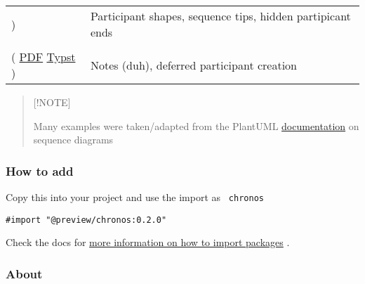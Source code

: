 \begin{longtable}[]{@{}
  >{\raggedright\arraybackslash}p{}
  >{\raggedright\arraybackslash}p{}@{}}
\begin{minipage}[t]{\linewidth}
)\strut
\end{minipage} & Participant shapes, sequence tips, hidden partipicant
ends \\
\begin{minipage}[t]{\linewidth}\raggedright
\texttt{\ notes\ }\strut \\
(
\href{https://github.com/typst/packages/raw/main/packages/preview/chronos/0.2.0/gallery/notes.pdf}{PDF}
\textbar{}
\href{https://github.com/typst/packages/raw/main/packages/preview/chronos/0.2.0/gallery/notes.typ}{Typst}
)\strut
\end{minipage} & Notes (duh), deferred participant creation \\
\end{longtable}

\begin{quote}
{[}!NOTE{]}

Many examples were taken/adapted from the PlantUML
\href{https://plantuml.com/sequence-diagram}{documentation} on sequence
diagrams
\end{quote}

\subsubsection{How to add}\label{how-to-add}

Copy this into your project and use the import as \texttt{\ chronos\ }

\begin{verbatim}
#import "@preview/chronos:0.2.0"
\end{verbatim}



Check the docs for
\href{https://typst.app/docs/reference/scripting/\#packages}{more
information on how to import packages} .

\subsubsection{About}\label{about}

